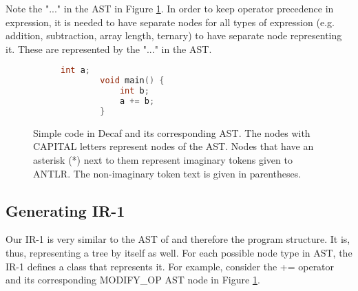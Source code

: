 \documentclass{article}[11pt]
\begin{document}
Note the "..." in the AST in Figure \ref{fig:ast}. In order to keep operator precedence in expression, it is needed to have separate nodes for all types of expression (e.g. addition, subtraction, array length, ternary) to have separate node representing it. These are represented by the "..." in the AST.

\begin{figure}
   \begin{subfigure}{0.45\linewidth}
        \begin{lstlisting}[language=C]
        int a;
        void main() {
            int b;
            a += b;
        }
        \end{lstlisting}
   \end{subfigure}
   \hspace{-2.5cm}
   \begin{subfigure}{0.45\linewidth}
   \end{subfigure}
   
   \caption{Simple code in Decaf and its corresponding AST. The nodes with CAPITAL letters represent nodes of the AST. Nodes that have an asterisk (*) next to them represent imaginary tokens given to ANTLR. The non-imaginary token text is given in parentheses.}
   \label{fig:ast}
\end{figure}

\subsection{Generating IR-1}
\label{sec:ir1}
Our IR-1 is very similar to the AST of and therefore the program structure. It is, thus, representing a tree by itself as well. For each possible node type in AST, the IR-1 defines a class that represents it. For example, consider the += operator and its corresponding MODIFY\_OP AST node in Figure \ref{fig:ast}.
\end{document}
